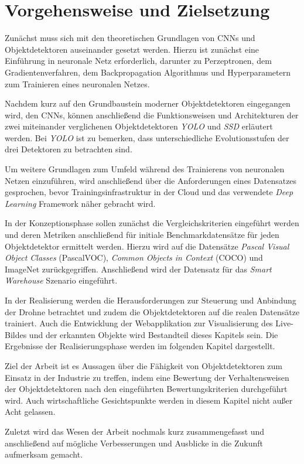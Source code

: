 \section{Vorgehensweise und Zielsetzung}


Zunächst muss sich mit den theoretischen Grundlagen von CNNs und Objektdetektoren auseinander gesetzt werden. Hierzu ist zunächst eine Einführung in neuronale Netz erforderlich, darunter zu Perzeptronen, dem Gradientenverfahren, dem Backpropagation Algorithmus und Hyperparametern zum Trainieren eines neuronalen Netzes. 

Nachdem kurz auf den Grundbaustein moderner Objektdetektoren eingegangen wird, den CNNs, können anschließend die Funktionsweisen und Architekturen der zwei miteinander verglichenen Objektdetektoren \textit{YOLO} und \textit{SSD} erläutert werden. Bei \textit{YOLO} ist zu bemerken, dass unterschiedliche Evolutionsstufen der drei Detektoren zu betrachten sind. 

Um weitere Grundlagen zum Umfeld während des Trainierens von neuronalen Netzen einzuführen, wird anschließend über die Anforderungen eines Datensatzes gesprochen, bevor Trainingsinfrastruktur in der Cloud und das verwendete \textit{Deep Learning} Framework näher gebracht wird. 

In der Konzeptionsphase sollen zunächst die Vergleichskriterien eingeführt werden und deren Metriken anschließend für initiale Benchmarkdatensätze für jeden Objektdetektor ermittelt werden. Hierzu wird auf die Datensätze \textit{Pascal Visual Object Classes} (PascalVOC), \textit{Common Objects in Context} (COCO) und ImageNet zurückgegriffen. Anschließend wird der Datensatz für das \textit{Smart Warehouse} Szenario eingeführt. 

In der Realisierung werden die Herausforderungen zur Steuerung und Anbindung der Drohne betrachtet und zudem die Objektdetektoren auf die realen Datensätze trainiert. Auch die Entwicklung der Webapplikation zur Visualisierung des Live-Bildes und der erkannten Objekte wird Bestandteil dieses Kapitels sein. Die Ergebnisse der Realisierungsphase werden im folgenden Kapitel dargestellt. 

Ziel der Arbeit ist es Aussagen über die Fähigkeit von Objektdetektoren zum Einsatz in der Industrie zu treffen, indem eine Bewertung der Verhaltensweisen der Objektdetektoren nach den eingeführten Bewertungskriterien durchgeführt wird. Auch wirtschaftliche Gesichtspunkte werden in diesem Kapitel nicht außer Acht gelassen. 

Zuletzt wird das Wesen der Arbeit nochmals kurz zusammengefasst und anschließend auf mögliche Verbesserungen und Ausblicke in die Zukunft aufmerksam gemacht. 
